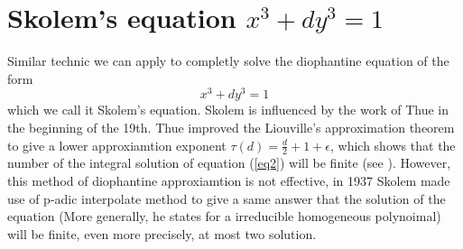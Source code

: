 \section{Skolem's equation $x^3+dy^3=1$}

Similar technic we can apply to completly solve the diophantine equation of the form
\begin{equation} \label{eq2}
    x^3+dy^3=1
\end{equation}
which we call it Skolem's equation. Skolem is influenced by the work of Thue in the beginning of the 19th. Thue improved the Liouville's approximation theorem to give a lower approxiamtion exponent \(\tau(d) = \frac{d}{2}+1+\epsilon\), which shows that the number of the integral solution of equation (\ref{eq2}) will be finite (see \cite[Chapter 11]{silverman2009arithmetic}). However, this method of diophantine approxiamtion is not effective, in 1937 Skolem made use of p-adic interpolate method to give a same answer that the solution of the equation (More generally, he states for a irreducible homogeneous polynoimal) will be finite, even more precisely, at most two solution.


